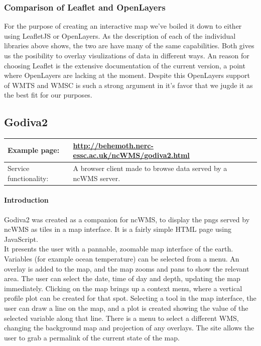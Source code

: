 \documentclass[11pt,a4paper,titlepage,oneside]{report}
\begin{document}
  \subsubsection{Comparison of Leaflet and OpenLayers}
    For the purpose of creating an interactive map we've boiled it down to either using LeafletJS or OpenLayers. As the description of each of the individual libraries above shows, the two are have many of the same capabilities. Both gives us the posibility to overlay visulizations of data in different ways. An reason for choosing Leaflet is the extensive documentation of the current version, a point where OpenLayers are lacking at the moment. Despite this OpenLayers support of \gls{WMTS} and \gls{WMSC} is such a strong argument in it's favor that we jugde it as the best fit for our purposes.
    
  \subsection{Godiva2}
     \begin{tabular}{|p{4cm}|p{8cm}|}
     \hline
     Example page: & \url{http://behemoth.nerc-essc.ac.uk/ncWMS/godiva2.html} \\
     \hline
     Service functionality: & A browser client made to browse data served by a ncWMS server. \\
     \hline
   \end{tabular}
   
  \paragraph{Introduction}
  Godiva2 was created as a companion for ncWMS, to display the pngs served by ncWMS as tiles in a map interface. It is a fairly simple \gls{HTML} page using JavaScript. \\
   It presents the user with a pannable, zoomable map interface of the earth. Variables (for example ocean temperature) can be selected from a menu. An overlay is added to the map, and the map zooms and pans to show the relevant area. The user can select the date, time of day and depth, updating the map immediately. Clicking on the map brings up a context menu, where a vertical profile plot can be created for that spot. Selecting a tool in the map interface, the user can draw a line on the map, and a plot is created showing the value of the selected variable along that line. There is a menu to select a different \gls{WMS}, changing the background map and projection of any overlays. The site allows the user to grab a permalink of the current state of the map.
\end{document}
